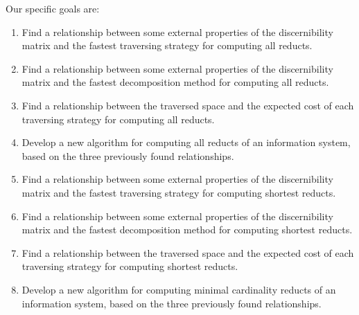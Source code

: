 \documentclass[authoryear,11pt]{elsarticle}
\begin{document}
  Our specific goals are:
  \begin{enumerate}
  \item Find a relationship between some external properties of the discernibility matrix and the fastest 
  		traversing strategy for computing all reducts.
  		  	
  \item Find a relationship between some external properties of the discernibility matrix and the fastest 
  		decomposition method for computing all reducts.
  		
  \item Find a relationship between the traversed space and the expected cost of each traversing strategy
  		for computing all reducts.
  
  \item Develop a new algorithm for computing all reducts of an information system, based 
  		on the three previously found relationships.
  		
  \item Find a relationship between some external properties of the discernibility matrix and the fastest 
  		traversing strategy for computing shortest reducts.
  		  	
  \item Find a relationship between some external properties of the discernibility matrix and the fastest 
  		decomposition method for computing shortest reducts.
  		
  \item Find a relationship between the traversed space and the expected cost of each traversing strategy
  		for computing shortest reducts.
  
  \item Develop a new algorithm for computing minimal cardinality reducts of an information system, based 
  		on the three previously found relationships.

  \end{enumerate}
\end{document}

